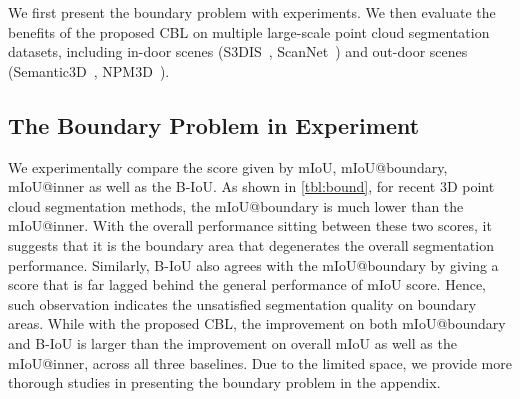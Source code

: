 \documentclass[10pt,twocolumn,letterpaper]{article}
\begin{document}
We first present the boundary problem with experiments. We then evaluate the benefits of the proposed CBL on multiple large-scale point cloud segmentation datasets, including in-door scenes (S3DIS~\cite{s3dis}, ScanNet~\cite{scannet}) and out-door scenes (Semantic3D~\cite{semantic3d}, NPM3D~\cite{npm3d}).

\subsection{The Boundary Problem in Experiment}
We experimentally compare the score given by mIoU, mIoU@boundary, mIoU@inner as well as the B-IoU. As shown in \cref{tbl:bound}, for recent 3D point cloud segmentation methods, the mIoU@boundary is much lower than the mIoU@inner. With the overall performance sitting between these two scores, it suggests that it is the boundary area that degenerates the overall segmentation performance. Similarly, B-IoU also agrees with the mIoU@boundary by giving a score that is far lagged behind the general performance of mIoU score. Hence, such observation indicates the unsatisfied segmentation quality on boundary areas.
While with the proposed CBL, the improvement on both mIoU@boundary and B-IoU is larger than the improvement on overall mIoU as well as the mIoU@inner, across all three baselines.
Due to the limited space, we provide more thorough studies in presenting the boundary problem in the appendix. 
\end{document}
